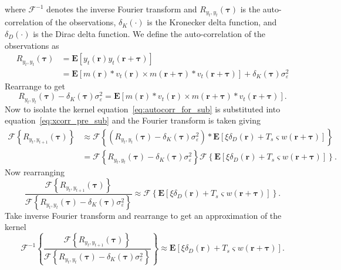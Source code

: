 \documentclass[]{article}
\begin{document}
where $\mathcal{F}^{-1}$ denotes the inverse Fourier transform and $R_{y_{t},y_{t}}(\boldsymbol{\tau})$ is the auto-correlation of the observations, $\delta_K(\cdot)$ is the Kronecker delta function, and $\delta_D(\cdot)$ is the Dirac delta function. We define the auto-correlation of the observations as
\begin{align}
	R_{y_{t},y_{t}}(\boldsymbol{\tau}) &= \mathbf{E}\left[ y_{t}\left(\mathbf{r}\right) y_{t}\left(\mathbf{r}+\boldsymbol{\tau}\right) \right]\\
	&= \mathbf{E}\left[m(\mathbf{r}) \ast v_t(\mathbf{r}) \times m(\mathbf{r}+\boldsymbol{\tau}) \ast v_t(\mathbf{r}+\boldsymbol{\tau})\right] + \delta_K(\boldsymbol{\tau})\sigma_{\varepsilon}^2
\end{align}
Rearrange to get
\begin{equation}\label{eq:autocorr_for_sub}
	R_{y_{t},y_{t}}(\boldsymbol{\tau}) - \delta_K(\boldsymbol{\tau})\sigma_{\varepsilon}^2 = \mathbf{E}\left[m(\mathbf{r}) \ast v_t(\mathbf{r}) \times m(\mathbf{r}+\boldsymbol{\tau}) \ast v_t(\mathbf{r}+\boldsymbol{\tau})\right].
\end{equation}
Now to isolate the kernel equation~\ref{eq:autocorr_for_sub} is substituted into equation~\ref{eq:xcorr_pre_sub} and the Fourier transform is taken giving
\begin{align}
	\mathcal{F}\left\{R_{y_{t},y_{t+1}}(\boldsymbol{\tau})\right\} &\approx \mathcal{F}\left\{ \left(R_{y_t,y_t}(\boldsymbol{\tau}) - \delta_K\left(\boldsymbol{\tau}\right)\sigma_{\varepsilon}^2\right) \ast \mathbf{E} \left[ \xi\delta_D(\mathbf{r})  + T_s \varsigma w(\mathbf{r}+\boldsymbol{\tau}) \right] \right\} \\
	&= \mathcal{F}\left\{ R_{y_t,y_t}(\boldsymbol{\tau}) - \delta_K\left(\boldsymbol{\tau}\right) \sigma_{\varepsilon}^2 \right\} \mathcal{F}\left\{\mathbf{E}[ \xi \delta_D(\mathbf{r})  + T_s \varsigma w(\mathbf{r}+\boldsymbol{\tau}) ]\right\}.
\end{align}
Now rearranging
\begin{equation}
	\frac{\mathcal{F}\left\{R_{y_{t},y_{t+1}}(\boldsymbol{\tau})\right\}}{\mathcal{F}\left\{ R_{y_t,y_t}(\boldsymbol{\tau}) - \delta_K\left(\boldsymbol{\tau}\right)\sigma_{\varepsilon}^2 \right\}} \approx \mathcal{F}\left\{ \mathbf{E}\left[ \xi\delta_D\left(\mathbf{r}\right)  + T_s \varsigma w(\mathbf{r}+\boldsymbol{\tau}) \right]\right\}.
\end{equation}
Take inverse Fourier transform and rearrange to get an approximation of the kernel
\begin{equation}
	\mathcal{F}^{-1}\left\{\frac{\mathcal{F}\left\{R_{y_{t},y_{t+1}}(\boldsymbol{\tau})\right\}}{\mathcal{F}\left\{ R_{y_t,y_t}(\boldsymbol{\tau}) - \delta_K\left(\boldsymbol{\tau}\right)\sigma_{\varepsilon}^2 \right\}}\right\} \approx \mathbf{E}[\xi\delta_D\left(\mathbf{r}\right)  + T_s \varsigma w(\mathbf{r}+\boldsymbol{\tau})].
\end{equation}
\end{document}
